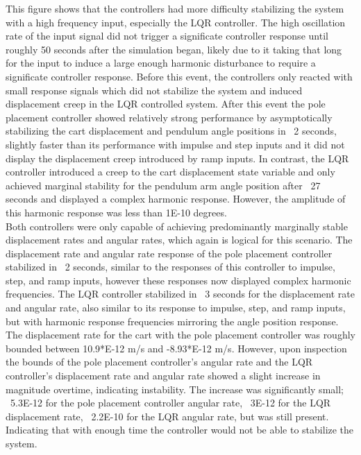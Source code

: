 \documentclass[titlepage]{article}
\begin{document}
This figure shows that the controllers had more difficulty stabilizing the system with a high frequency input, especially the LQR controller. The high oscillation rate of the input signal did not trigger a significate controller response until roughly 50 seconds after the simulation began, likely due to it taking that long for the input to induce a large enough harmonic disturbance to require a significate controller response.  Before this event, the controllers only reacted with small response signals which did not stabilize the system and induced displacement creep in the LQR controlled system. After this event the pole placement controller showed relatively strong performance by asymptotically stabilizing the cart displacement and pendulum angle positions in ~2 seconds, slightly faster than its performance with impulse and step inputs and it did not display the displacement creep introduced by ramp inputs. In contrast, the LQR controller introduced a creep to the cart displacement state variable and only achieved marginal stability for the pendulum arm angle position after ~27 seconds  and displayed a complex harmonic  response. However, the amplitude of this harmonic response was less than 1E-10 degrees.\\

Both controllers were only capable of achieving predominantly marginally stable displacement rates and angular rates, which again is logical for this scenario. The displacement rate and angular rate response of the pole placement controller stabilized in ~2 seconds, similar to the responses of this controller to impulse, step, and ramp inputs, however these responses now displayed complex harmonic frequencies. The LQR controller stabilized in ~3 seconds for the displacement rate and angular rate, also similar to its response to impulse, step, and ramp inputs, but with harmonic response frequencies mirroring the angle position response. The displacement rate for the cart with the pole placement controller was roughly bounded between 10.9*E-12 m/s and -8.93*E-12 m/s. However, upon inspection the bounds of the pole placement controller’s angular rate and the LQR controller’s displacement rate and angular rate showed a slight increase in magnitude overtime, indicating instability. The increase was significantly small; ~5.3E-12 for the pole placement controller angular rate, ~3E-12 for the LQR displacement rate, ~2.2E-10 for the LQR angular rate, but was still present. Indicating that with enough time the controller would not be able to stabilize the system.
\end{document}

